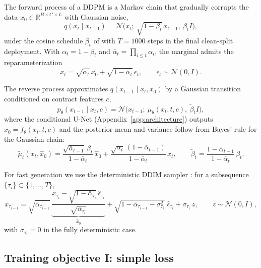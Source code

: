 ﻿\documentclass[12pt,letterpaper]{article}
\begin{document}
The forward process of a DDPM is a Markov chain that gradually corrupts the
data $x_0 \in \mathbb{R}^{B \times C \times L}$ with Gaussian noise,
\begin{equation}
q(x_t \mid x_{t-1}) = \mathcal{N}\bigl(x_t;\ \sqrt{1-\beta_t}\,x_{t-1},\
\beta_t I\bigr),
\end{equation}
under the cosine schedule $\beta_t$ of \citet{nichol2021improved} with
$T = 1000$ steps in the final clean-split deployment. With $\alpha_t = 1 - \beta_t$ and
$\bar\alpha_t = \prod_{i \le t} \alpha_i$, the marginal admits the
reparameterization
\begin{equation}
x_t = \sqrt{\bar\alpha_t}\,x_0 + \sqrt{1-\bar\alpha_t}\,\epsilon_t,
\qquad \epsilon_t \sim \mathcal{N}(0, I).
\end{equation}

The reverse process approximates $q(x_{t-1} \mid x_t, x_0)$ by a Gaussian
transition conditioned on contract features $c$,
\begin{equation}
p_\theta(x_{t-1} \mid x_t, c) = \mathcal{N}\bigl(x_{t-1};\
\mu_\theta(x_t, t, c),\ \tilde\beta_t I\bigr),
\end{equation}
where the conditional U-Net (Appendix~\ref{app:architecture}) outputs
$\hat x_0 = f_\theta(x_t, t, c)$ and the posterior mean and variance follow
from Bayes' rule for the Gaussian chain:
\begin{equation}
\tilde\mu_t(x_t, \hat x_0)
= \frac{\sqrt{\bar\alpha_{t-1}}\,\beta_t}{1-\bar\alpha_t}\,\hat x_0
+ \frac{\sqrt{\alpha_t}\,(1-\bar\alpha_{t-1})}{1-\bar\alpha_t}\,x_t,
\qquad
\tilde\beta_t = \frac{1-\bar\alpha_{t-1}}{1-\bar\alpha_t}\,\beta_t .
\end{equation}

For fast generation we use the deterministic DDIM sampler
\citep{song2020ddim}: for a subsequence $\{\tau_i\} \subset \{1,\dots,T\}$,
\begin{equation}
x_{\tau_{i-1}}
= \sqrt{\bar\alpha_{\tau_{i-1}}}\,
\underbrace{\frac{x_{\tau_i} - \sqrt{1-\bar\alpha_{\tau_i}}\,
\hat\epsilon_{\tau_i}}{\sqrt{\bar\alpha_{\tau_i}}}}_{\hat x_0}
+ \sqrt{1-\bar\alpha_{\tau_{i-1}} - \sigma_{\tau_i}^2}\;\hat\epsilon_{\tau_i}
+ \sigma_{\tau_i}\, z,
\qquad z \sim \mathcal{N}(0, I),
\end{equation}
with $\sigma_{\tau_i} = 0$ in the fully deterministic case.

\subsection{Training objective I: simple loss}\label{sec:simpleloss}
\end{document}
